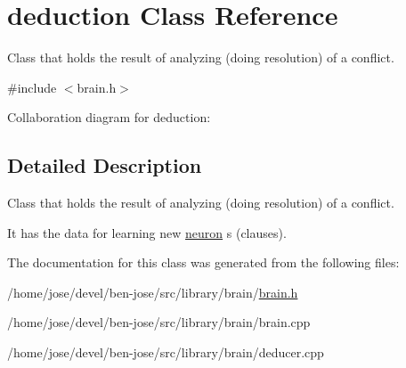 \hypertarget{classdeduction}{}\section{deduction Class Reference}
\label{classdeduction}


Class that holds the result of analyzing (doing resolution) of a conflict.  




{\ttfamily \#include $<$brain.\+h$>$}



Collaboration diagram for deduction\+:


\subsection{Detailed Description}
Class that holds the result of analyzing (doing resolution) of a conflict. 

It has the data for learning new \hyperlink{classneuron}{neuron} s (clauses). 

The documentation for this class was generated from the following files\+:\begin{DoxyCompactItemize}
\item 
/home/jose/devel/ben-\/jose/src/library/brain/\hyperlink{brain_8h}{brain.\+h}\item 
/home/jose/devel/ben-\/jose/src/library/brain/brain.\+cpp\item 
/home/jose/devel/ben-\/jose/src/library/brain/deducer.\+cpp\end{DoxyCompactItemize}
